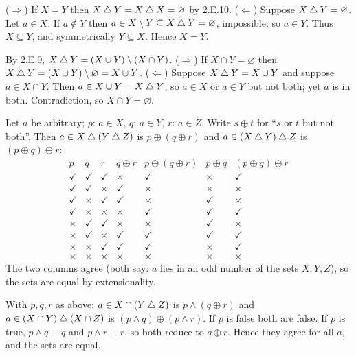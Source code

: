  ($\Rightarrow$) If $X=Y$ then $X\mathbin{\triangle} Y=X\mathbin{\triangle} X=\varnothing$ by 2.E.10. ($\Leftarrow$) Suppose $X\mathbin{\triangle} Y=\varnothing$. Let $a\in X$. If $a\notin Y$ then $a\in X\setminus Y\subseteq X\mathbin{\triangle} Y=\varnothing$, impossible; so $a\in Y$. Thus $X\subseteq Y$, and symmetrically $Y\subseteq X$. Hence $X=Y$.

 By 2.E.9, $X\mathbin{\triangle} Y=(X\cup Y)\setminus(X\cap Y)$. ($\Rightarrow$) If $X\cap Y=\varnothing$ then $X\mathbin{\triangle} Y=(X\cup Y)\setminus\varnothing=X\cup Y$. ($\Leftarrow$) Suppose $X\mathbin{\triangle} Y=X\cup Y$ and suppose $a\in X\cap Y$. Then $a\in X\cup Y=X\mathbin{\triangle} Y$, so $a\in X$ or $a\in Y$ but not both; yet $a$ is in both. Contradiction, so $X\cap Y=\varnothing$.

 Let $a$ be arbitrary; $p$: $a\in X$, $q$: $a\in Y$, $r$: $a\in Z$. Write $s\oplus t$ for ``$s$ or $t$ but not both''. Then $a\in X\mathbin{\triangle}(Y\mathbin{\triangle} Z)$ is $p\oplus(q\oplus r)$ and $a\in(X\mathbin{\triangle} Y)\mathbin{\triangle} Z$ is $(p\oplus q)\oplus r$:
\[
\begin{array}{ccc|c|c|c|c}
p&q&r&q\oplus r&p\oplus(q\oplus r)&p\oplus q&(p\oplus q)\oplus r\\\hline
\checkmark&\checkmark&\checkmark&\times&\checkmark&\times&\checkmark\\
\checkmark&\checkmark&\times&\checkmark&\times&\times&\times\\
\checkmark&\times&\checkmark&\checkmark&\times&\checkmark&\times\\
\checkmark&\times&\times&\times&\checkmark&\checkmark&\checkmark\\
\times&\checkmark&\checkmark&\times&\times&\checkmark&\times\\
\times&\checkmark&\times&\checkmark&\checkmark&\checkmark&\checkmark\\
\times&\times&\checkmark&\checkmark&\checkmark&\times&\checkmark\\
\times&\times&\times&\times&\times&\times&\times
\end{array}
\]
The two columns agree (both say: $a$ lies in an odd number of the sets $X,Y,Z$), so the sets are equal by extensionality.

 With $p,q,r$ as above: $a\in X\cap(Y\mathbin{\triangle} Z)$ is $p\wedge(q\oplus r)$ and $a\in(X\cap Y)\mathbin{\triangle}(X\cap Z)$ is $(p\wedge q)\oplus(p\wedge r)$. If $p$ is false both are false. If $p$ is true, $p\wedge q\equiv q$ and $p\wedge r\equiv r$, so both reduce to $q\oplus r$. Hence they agree for all $a$, and the sets are equal.

